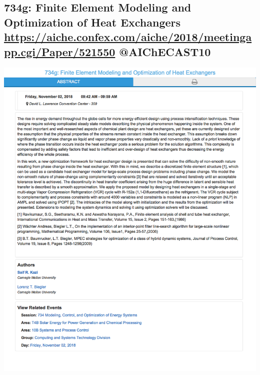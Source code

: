 \documentclass[11pt]{article}
\begin{document}
\subsection{734g: Finite Element Modeling and Optimization of Heat Exchangers \url{https://aiche.confex.com/aiche/2018/meetingapp.cgi/Paper/521550} @AIChECAST10}
\label{sec:org036d912}
\begin{center}
\includegraphics[width=.9\linewidth]{./521550.png}
\end{center}
\end{document}
